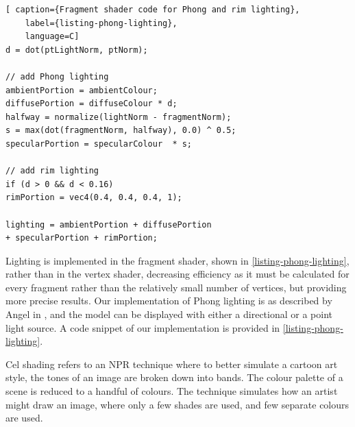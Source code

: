 \begin{lstlisting}[ caption={Fragment shader code for Phong and rim lighting},
    label={listing-phong-lighting}, 
    language=C]
d = dot(ptLightNorm, ptNorm);

// add Phong lighting
ambientPortion = ambientColour;
diffusePortion = diffuseColour * d;
halfway = normalize(lightNorm - fragmentNorm);
s = max(dot(fragmentNorm, halfway), 0.0) ^ 0.5;
specularPortion = specularColour  * s;

// add rim lighting
if (d > 0 && d < 0.16)
rimPortion = vec4(0.4, 0.4, 0.4, 1);

lighting = ambientPortion + diffusePortion
+ specularPortion + rimPortion;
\end{lstlisting}

Lighting is implemented in the fragment shader, shown in \autoref{listing-phong-lighting}, rather than in the vertex shader, decreasing 
efficiency as it must be calculated for every fragment rather than the relatively small number of 
vertices, but providing more precise results. Our implementation of Phong lighting is as described 
by Angel in \cite{texbook}, and the model can be displayed with either a directional or a point light 
source. A code snippet of our implementation is provided in \autoref{listing-phong-lighting}.

\newpage 
Cel shading refers to an NPR technique where to better simulate a cartoon art style, the tones of 
an image are broken down into bands. The colour palette of a scene is reduced to a handful of colours.
The technique simulates how an artist might draw an image, where only a few shades are used, and few
separate colours are used.

